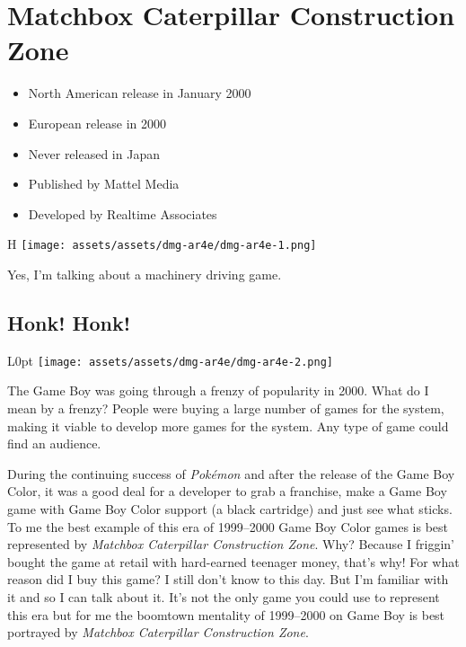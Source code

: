 \documentclass{book}
\begin{document}
\begingroup \chapter*{Matchbox Caterpillar Construction Zone} \endgroup

\begin{itemize} \setlength\itemsep{-0.4em}
\item North American release in January 2000
\item European release in 2000
\item Never released in Japan
\item Published by Mattel Media
\item Developed by Realtime Associates
\end{itemize}\noindent

\begin{wrapfigure}{H}{\linewidth}
\vskip 4pt
\centering \texttt{[image: assets/assets/dmg-ar4e/dmg-ar4e-1.png]}\par\pagetwodescription Yes, I’m talking about a machinery driving game.\end{wrapfigure}
\clearpage

\FloatBarrier\needspace{5pt}\section*{Honk! Honk!}\nopagebreak[4]

\begin{wrapfigure}{L}{0pt} \texttt{[image: assets/assets/dmg-ar4e/dmg-ar4e-2.png]}\end{wrapfigure}
The Game Boy was going through a frenzy of popularity in 2000. What do I mean by a frenzy? People were buying a large number of games for the system, making it viable to develop more games for the system. Any type of game could find an audience.

During the continuing success of \emph{Pokémon} and after the release of the Game Boy Color, it was a good deal for a developer to grab a franchise, make a Game Boy game with Game Boy Color support (a black cartridge) and just see what sticks. To me the best example of this era of 1999–2000 Game Boy Color games is best represented by \emph{Matchbox Caterpillar Construction Zone}. Why? Because I friggin’ bought the game at retail with hard-earned teenager money, that’s why! For what reason did I buy this game? I still don’t know to this day. But I’m familiar with it and so I can talk about it. It’s not the only game you could use to represent this era but for me the boomtown mentality of 1999–2000 on Game Boy is best portrayed by \emph{Matchbox Caterpillar Construction Zone}.
\end{document}
